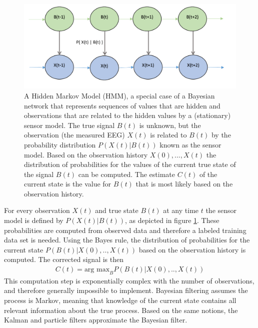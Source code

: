 \documentclass[twoside]{article}
\begin{document}
\begin{figure}[h]
\centering

  \includegraphics[width=.99\linewidth]{bayes}
  \caption{A Hidden Markov Model (HMM), a special case of a Bayesian network that represents sequences of values that are hidden and observations that are related to the hidden values by a (stationary) sensor model. The true signal $B(t)$ is unknown, but the observation (the measured EEG) $X(t)$ is related to $B(t)$ by the probability distribution $P(X(t) | B(t))$ known as the sensor model. Based on the observation history $X(0),...,X(t)$ the distribution of probabilities for the values of the current true state of the signal $B(t)$ can be computed. The estimate $C(t)$ of the current state is the value for $B(t)$ that is most likely based on the observation history.  }
  

\label{fig:bayes}
\end{figure}

For every observation $X(t)$ and true state $B(t)$ at any time $t$ the sensor model is defined by $P(X(t) | B(t))$, as depicted in figure \ref{fig:bayes}. These probabilities are computed from observed data and therefore a labeled training data set is needed. Using the Bayes rule, the distribution of probabilities for the current state $P(B(t) | X(0), .. , X(t))$ based on the observation history is computed. The corrected signal is then \begin{align}
C(t) = \textrm{arg max}_B P( B(t) | X(0), .. , X(t))
\end{align}
This computation step is exponentially complex with the number of observations, and therefore generally impossible to implement. Bayesian filtering assumes the process is Markov, meaning that knowledge of the current state contains all relevant information about the true process. Based on the same notions, the Kalman and particle filters approximate the Bayesian filter. 
\end{document}
